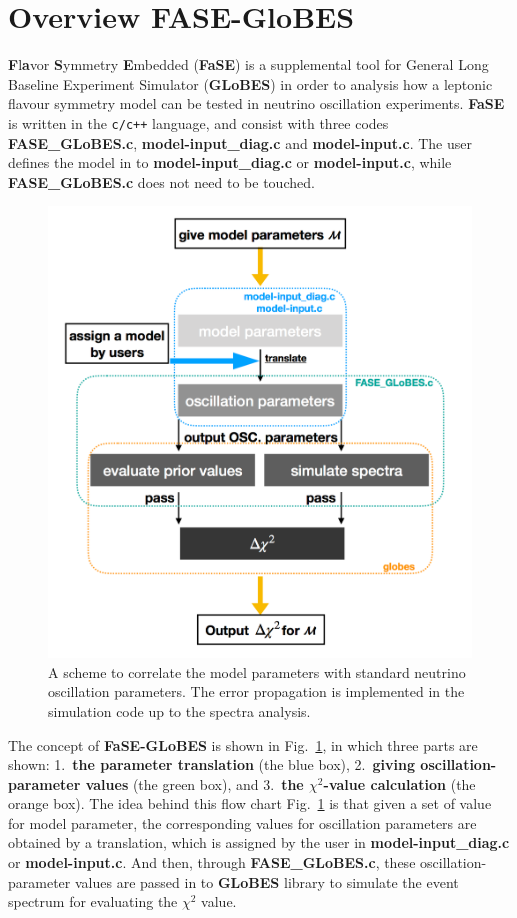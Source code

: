 \documentclass[aps,prd,nofootinbib,preprint]{revtex4}
\begin{document}
\section{Overview FASE-GloBES}

\textbf{F}l\textbf{a}vor \textbf{S}ymmetry \textbf{E}mbedded (\textbf{FaSE}) is a supplemental tool for General Long Baseline Experiment Simulator (\textbf{GLoBES}) in order to analysis how a leptonic flavour symmetry model can be tested in neutrino oscillation experiments. \textbf{FaSE} is written in the \texttt{c/c++} language, and consist with three codes \textbf{FASE\_GLoBES.c}, \textbf{model-input\_diag.c} and \textbf{model-input.c}. The user defines the model in to \textbf{model-input\_diag.c} or \textbf{model-input.c}, while \textbf{FASE\_GLoBES.c} does not need to be touched. 

\begin{figure}[!h]%
\centering
\includegraphics[width=4.5in]{Figs/FASE-chart_1_v1.pdf}
\caption{A scheme to correlate the model parameters with standard neutrino oscillation parameters. The error propagation is implemented in the simulation code up to the spectra analysis.}%
\label{fig:FASE}
\end{figure}


The concept of \textbf{FaSE-GLoBES} is shown in Fig.~\ref{fig:FASE}, in which three parts are shown: 1.~\textbf{the parameter translation} (the blue box), 2.~\textbf{giving oscillation-parameter values} (the green box), and 3.~\textbf{the $\chi^2$-value calculation} (the orange box). 
The idea behind this flow chart Fig.~\ref{fig:FASE} is that given a set of value for model parameter, the corresponding values for oscillation parameters are obtained by a translation, which is assigned by the user in \textbf{model-input\_diag.c} or \textbf{model-input.c}. And then, through \textbf{FASE\_GLoBES.c}, these oscillation-parameter values are passed in to \textbf{GLoBES} library to simulate the event spectrum for evaluating the $\chi^2$ value. 
\end{document}
